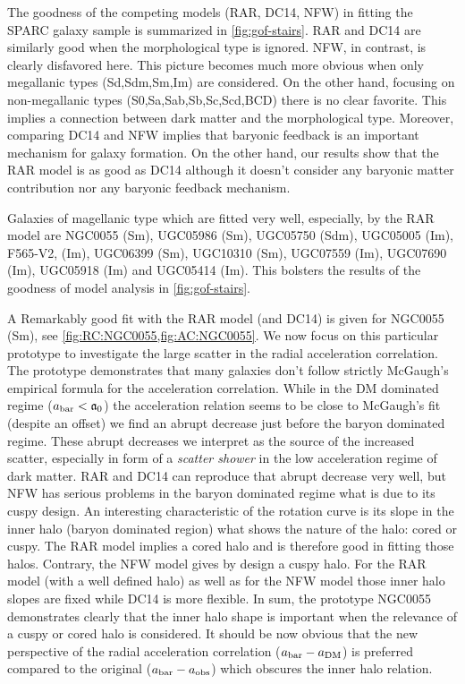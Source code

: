 The goodness of the competing models (RAR, DC14, NFW) in fitting the SPARC galaxy sample is summarized in \cref{fig:gof-stairs}. RAR and DC14 are similarly good when the morphological type is ignored. NFW, in contrast, is clearly disfavored here. This picture becomes much more obvious when only megallanic types (Sd,Sdm,Sm,Im) are considered. On the other hand, focusing on non-megallanic types (S0,Sa,Sab,Sb,Sc,Scd,BCD) there is no clear favorite. This implies a connection between dark matter and the morphological type. Moreover, comparing DC14 and NFW implies that baryonic feedback is an important mechanism for galaxy formation. On the other hand, our results show that the RAR model is as good as DC14 although it doesn't consider any baryonic matter contribution nor any baryonic feedback mechanism.

Galaxies of magellanic type which are fitted very well, especially, by the RAR model are NGC0055 (Sm), UGC05986 (Sm), UGC05750 (Sdm), UGC05005 (Im), F565-V2, (Im), UGC06399 (Sm), UGC10310 (Sm), UGC07559 (Im), UGC07690 (Im), UGC05918 (Im) and UGC05414 (Im). This bolsters the results of the goodness of model analysis in \cref{fig:gof-stairs}.



A Remarkably good fit with the RAR model (and DC14) is given for NGC0055 (Sm), see \cref{fig:RC:NGC0055,fig:AC:NGC0055}. We now focus on this particular prototype to investigate the large scatter in the radial acceleration correlation. The prototype demonstrates that many galaxies don't follow strictly McGaugh's empirical formula for the acceleration correlation. While in the DM dominated regime ($a_\mathrm{bar} < \mathfrak{a}_0$) the acceleration relation seems to be close to McGaugh's fit (despite an offset) we find an abrupt decrease just before the baryon dominated regime. These abrupt decreases we interpret as the source of the increased scatter, especially in form of a \textit{scatter shower} in the low acceleration regime of dark matter. RAR and DC14 can reproduce that abrupt decrease very well, but NFW has serious problems in the baryon dominated regime what is due to its cuspy design. An interesting characteristic of the rotation curve is its slope in the inner halo (baryon dominated region) what shows the nature of the halo: cored or cuspy. The RAR model implies a cored halo and is therefore good in fitting those halos. Contrary, the NFW model gives by design a cuspy halo. For the RAR model (with a well defined halo) as well as for the NFW model those inner halo slopes are fixed while DC14 is more flexible. In sum, the prototype NGC0055 demonstrates clearly that the inner halo shape is important when the relevance of a cuspy or cored halo is considered. It should be now obvious that the new perspective of the radial acceleration correlation ($a_\mathrm{bar}-a_\mathrm{DM}$) is preferred compared to the original ($a_\mathrm{bar}-a_\mathrm{obs}$) which obscures the inner halo relation.

